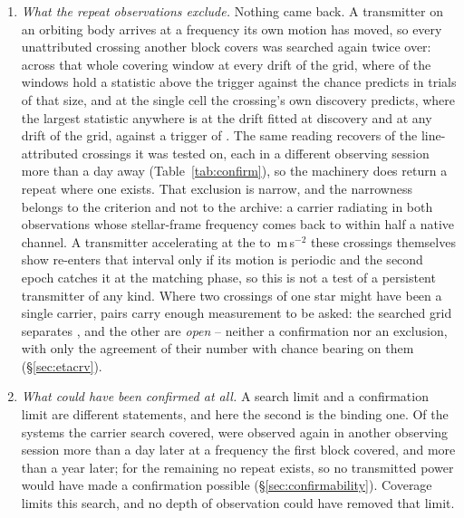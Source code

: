 \begin{enumerate}[leftmargin=1.6em,itemsep=4pt,topsep=4pt,parsep=0pt]
\item \emph{What the repeat observations exclude.} Nothing came back. A
transmitter on an orbiting body arrives at a frequency its own motion has
moved, so every unattributed crossing another block covers was searched again
twice over: across that whole covering window at every drift of the grid,
where \WdNExc{} of the \WdNCov{} windows hold a statistic above the trigger
against the \WdExpect{} chance predicts in trials of that size, and at the
single cell the crossing's own discovery predicts, where the largest
statistic anywhere is \RcTMatched{} at the drift fitted at discovery and
\RcTMax{} at any drift of the grid, against a trigger of \StageNullTrig. The
same reading recovers \MkAttrRecur{} of the \MkAttrTested{} line-attributed
crossings it was tested on, each in a different observing session more than a
day away (Table~\ref{tab:confirm}), so the machinery does return a repeat
where one exists. That exclusion is narrow, and the
narrowness belongs to the criterion and not to the archive: a carrier radiating in both
observations whose stellar-frame frequency comes back to within half a native
channel. A transmitter accelerating at the \ZtALosLo{} to
\ZtALosHi\,m\,s$^{-2}$ these crossings themselves show re-enters that
interval only if its motion is periodic and the second epoch catches it at
the matching phase, so this is not a test of a persistent transmitter of any
kind. Where two crossings of one star might have been a single carrier,
\TjNPair{} pairs carry enough measurement to be asked: the searched grid
separates \TjNExcl, and the other \TjNOpen{} are \emph{open} -- neither a
confirmation nor an exclusion, with only the agreement of their number with
chance bearing on them (\S\ref{sec:etacrv}).

\item \emph{What could have been confirmed at all.} A search limit and a
confirmation limit are different statements, and here the second is the
binding one. Of the \NSysClassA{} systems the carrier search covered,
\ZcConfSysDay{} were observed again in another observing session more than a
day later at a frequency the first block covered, and \ZcConfSysYr{} more
than a year later; for the remaining \ZcNoRepSys{} no repeat exists, so no
transmitted power would have made a confirmation possible
(\S\ref{sec:confirmability}). Coverage limits this search, and no depth
of observation could have removed that limit.


\end{enumerate}
